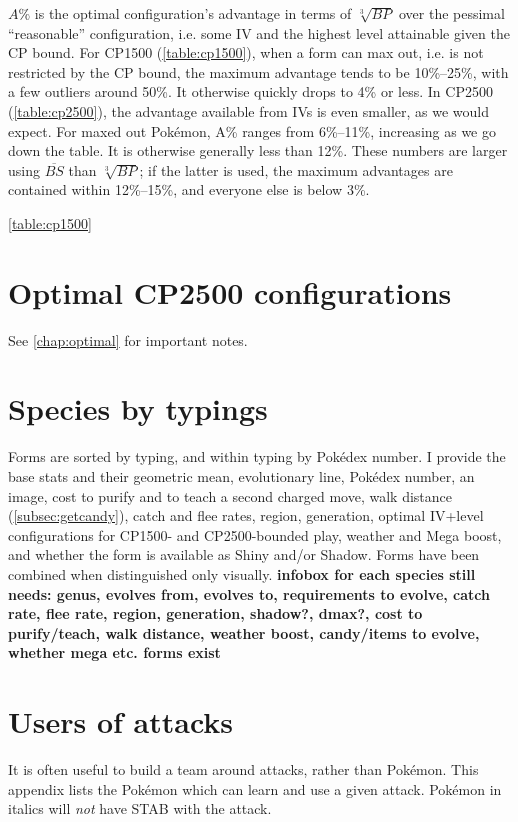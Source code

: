 \documentclass[ebook,10pt,openany,oneside]{memoir}
\begin{document}
$A\%$ is the optimal configuration's advantage in terms of $\sqrt[3]{BP}$
  over the pessimal ``reasonable'' configuration, i.e. some IV
  and the highest level attainable given the CP bound.
For CP1500 (\autoref{table:cp1500}), when a form can max out, i.e. is not restricted by the CP bound,
  the maximum advantage tends to be 10\%--25\%, with a few outliers around 50\%.
It otherwise quickly drops to 4\% or less.
In CP2500 (\autoref{table:cp2500}), the advantage available from IVs is even smaller, as we would expect.
For maxed out Pokémon, A\% ranges from 6\%--11\%, increasing as we go down the table.
It is otherwise generally less than 12\%.
These numbers are larger using $\overline{BS}$ than $\sqrt[3]{BP}$; if the latter is used,
  the maximum advantages are contained within 12\%--15\%, and everyone
  else is below 3\%.


\autoref{table:cp1500}


\chapter{Optimal CP2500 configurations}
See \autoref{chap:optimal} for important notes.


\chapter{Species by typings}
\label{chap:speciesbytype}
Forms are sorted by typing, and within typing by Pokédex number.
I provide the base stats and their geometric mean, evolutionary line,
 Pokédex number, an image, cost to purify and to teach a second charged
 move, walk distance (\autoref{subsec:getcandy}), catch and flee rates,
 region, generation, optimal IV+level configurations for CP1500-
 and CP2500-bounded play, weather and Mega boost, and whether the
 form is available as Shiny and/or Shadow.
Forms have been combined when distinguished only visually.
\textbf{infobox for each species still needs: genus, evolves from, evolves to,
           requirements to evolve, catch rate, flee rate, region, generation, shadow?, dmax?,
           cost to purify/teach, walk distance, weather boost, candy/items to evolve,
           whether mega etc. forms exist}


\chapter{Users of attacks}
\label{chap:attackemployers}
It is often useful to build a team around attacks, rather than Pokémon.
This appendix lists the Pokémon which can learn and use a given attack.
Pokémon in italics will \textit{not} have STAB with the attack.
\end{document}
